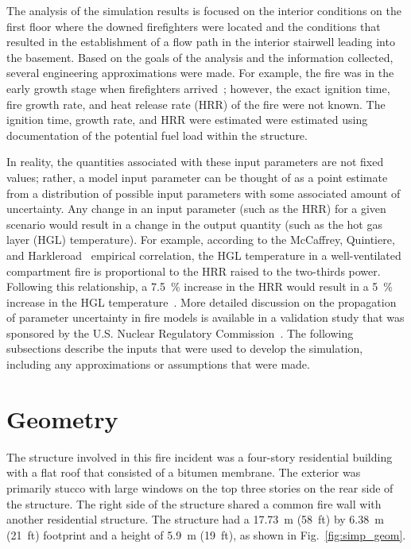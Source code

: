 \documentclass[12pt,oneside]{book}
\begin{document}
The analysis of the simulation results is focused on the interior conditions on the first floor where the downed firefighters were located and the conditions that resulted in the establishment of a flow path in the interior stairwell leading into the basement. Based on the goals of the analysis and the information collected, several engineering approximations were made. For example, the fire was in the early growth stage when firefighters arrived~\cite{NIOSH:Bowyer2}; however, the exact ignition time, fire growth rate, and heat release rate (HRR) of the fire were not known. The ignition time, growth rate, and HRR were estimated were estimated using documentation of the potential fuel load within the structure.

In reality, the quantities associated with these input parameters are not fixed values; rather, a model input parameter can be thought of as a point estimate from a distribution of possible input parameters with some associated amount of uncertainty. Any change in an input parameter (such as the HRR) for a given scenario would result in a change in the output quantity (such as the hot gas layer (HGL) temperature). For example, according to the McCaffrey, Quintiere, and Harkleroad~\cite{SFPE:Walton} empirical correlation, the HGL temperature in a well-ventilated compartment fire is proportional to the HRR raised to the two-thirds power. Following this relationship, a 7.5~\% increase in the HRR would result in a 5~\% increase in the HGL temperature~\cite{NUREG_1824_Sup_1}. More detailed discussion on the propagation of parameter uncertainty in fire models is available in a validation study that was sponsored by the U.S. Nuclear Regulatory Commission~\cite{NUREG_1824_Sup_1}. The following subsections describe the inputs that were used to develop the simulation, including any approximations or assumptions that were made.

\section{Geometry}
\label{sec:geometry}

The structure involved in this fire incident was a four-story residential building with a flat roof that consisted of a bitumen membrane. The exterior was primarily stucco with large windows on the top three stories on the rear side of the structure. The right side of the structure shared a common fire wall with another residential structure. The structure had a 17.73~m (58~ft) by 6.38~m (21~ft) footprint and a height of 5.9~m (19~ft), as shown in Fig.~\ref{fig:simp_geom}.
\end{document}
